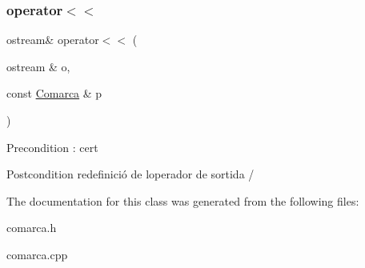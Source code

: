 \subsubsection{\texorpdfstring{operator$<$$<$}{operator<<}}
{\footnotesize\ttfamily ostream\& operator$<$$<$ (\begin{DoxyParamCaption}\item[{ostream \&}]{o,  }\item[{const \hyperlink{classComarca}{Comarca} \&}]{p }\end{DoxyParamCaption})\hspace{0.3cm}{\ttfamily [friend]}}

\begin{DoxyPrecond}{Precondition}
\+: cert 
\end{DoxyPrecond}
\begin{DoxyPostcond}{Postcondition}
redefinició de l\textquotesingle{}operador de sortida /  
\end{DoxyPostcond}


The documentation for this class was generated from the following files\+:\begin{DoxyCompactItemize}
\item 
comarca.\+h\item 
comarca.\+cpp\end{DoxyCompactItemize}
